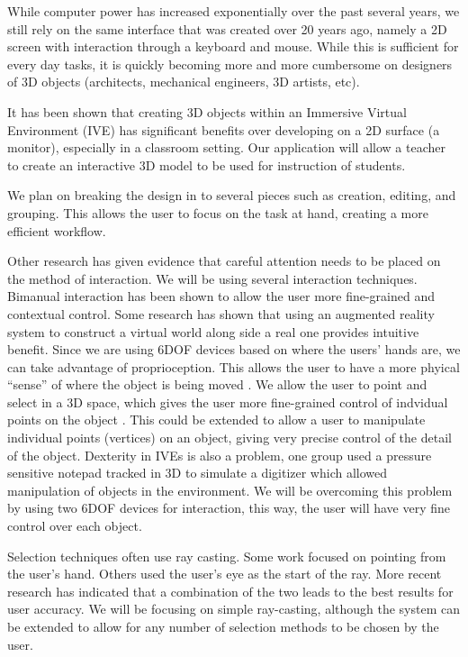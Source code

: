 While computer power has increased exponentially over the past several years, we still rely on the same interface that was created over 20 years ago, namely a 2D screen with interaction through a keyboard and mouse.
While this is sufficient for every day tasks, it is quickly becoming more and more cumbersome on designers of 3D objects (architects, mechanical engineers, 3D artists, etc)\cite{Dekker199242}.

It has been shown that creating 3D objects within an Immersive Virtual Environment (IVE) has significant benefits over developing on a 2D surface (a monitor)\cite{Kaufmann:Usability}, especially in a classroom setting\cite{Kaufmann:LearningGeometry}.
Our application will allow a teacher to create an interactive 3D model to be used for instruction of students.

We plan on breaking the design in to several pieces such as creation, editing, and grouping.
This allows the user to focus on the task at hand, creating a more efficient workflow\cite{Butterworth:1992:3DM}.

Other research has given evidence that careful attention needs to be placed on the method of interaction\cite{Bowman98interactiontechniques}.
We will be using several interaction techniques.\cite{AdvanceAndApplication}
Bimanual interaction has been shown to allow the user more fine-grained and contextual control\cite{Zeleznik:1997:TPI:253284.253316}.
Some research has shown that using an augmented reality system to construct a virtual world along side a real one provides intuitive benefit\cite{Jota:2011:CVM:1979742.1979915}.
Since we are using 6DOF devices based on where the users' hands are, we can take advantage of proprioception.
This allows the user to have a more phyical ``sense'' of where the object is being moved \cite{Mine:MovingObjects}.
We allow the user to point and select in a 3D space, which gives the user more fine-grained control of indvidual points on the object \cite{5759472}.
This could be extended to allow a user to manipulate individual points (vertices) on an object, giving very precise control of the detail of the object.
Dexterity in IVEs is also a problem, one group used a pressure sensitive notepad tracked in 3D to simulate a digitizer which allowed manipulation of objects in the environment\cite{658467}.
We will be overcoming this problem by using two 6DOF devices for interaction, this way, the user will have very fine control over each object.

Selection techniques often use ray casting.
Some work focused on pointing from the user's hand\cite{Mine:MovingObjects}.
Others used the user's eye as the start of the ray\cite{Pierce:1997:IPI:253284.253303}.
More recent research has indicated that a combination of the two leads to the best results for user accuracy\cite{5307641}.
We will be focusing on simple ray-casting, although the system can be extended to allow for any number of selection methods to be chosen by the user.

